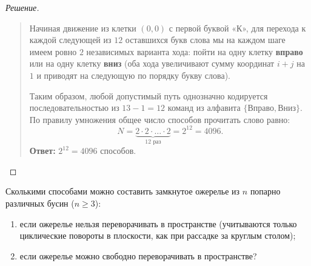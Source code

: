 \begin{proof}[Решение]
\begin{quote}
        Начиная движение из клетки $(0, 0)$ с первой буквой «К», для 
        перехода к каждой следующей из $12$ оставшихся букв слова мы на 
        каждом шаге имеем ровно $2$ независимых варианта хода: пойти на 
        одну клетку \textbf{вправо} или на одну клетку \textbf{вниз} (оба 
        хода увеличивают сумму координат $i + j$ на $1$ и приводят на 
        следующую по порядку букву слова).

        Таким образом, любой допустимый путь однозначно кодируется 
        последовательностью из $13 - 1 = 12$ команд из алфавита 
        $\{\text{Вправо}, \text{Вниз}\}$. По правилу умножения общее число 
        способов прочитать слово равно:
        \begin{equation} \label{eq:comb_paths}
            N = \underbrace{2 \cdot 2 \cdot \dots \cdot 2}_{12 \text{ раз}} = 
            2^{12} = 4096. \tag{7}
        \end{equation}
        \textbf{Ответ:} $2^{12} = 4096$ способов.
    \end{quote}
\end{proof}

\begin{problem}
    Сколькими способами можно составить замкнутое ожерелье из $n$ попарно 
    различных бусин ($n \ge 3$):
    \begin{enumerate}
        \item если ожерелье нельзя переворачивать в пространстве 
        (учитываются только циклические повороты в плоскости, как при 
        рассадке за круглым столом);
        \item если ожерелье можно свободно переворачивать в пространстве?
    \end{enumerate}
\end{problem}

